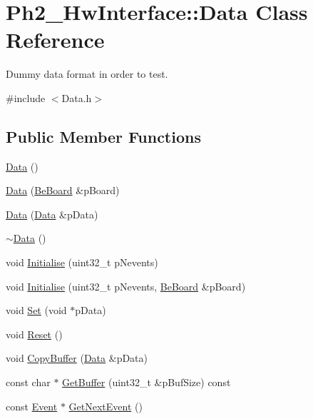 \hypertarget{class_ph2___hw_interface_1_1_data}{\section{Ph2\-\_\-\-Hw\-Interface\-:\-:Data Class Reference}
\label{class_ph2___hw_interface_1_1_data}
}


Dummy data format in order to test.  




{\ttfamily \#include $<$Data.\-h$>$}

\subsection*{Public Member Functions}
\begin{DoxyCompactItemize}
\item 
\hyperlink{class_ph2___hw_interface_1_1_data_a72e6b3c8af444dd82569d3a47f89812c}{Data} ()
\item 
\hyperlink{class_ph2___hw_interface_1_1_data_aa98dbf6219ca78afda306b2fa41dbcc5}{Data} (\hyperlink{class_ph2___hw_description_1_1_be_board}{Be\-Board} \&p\-Board)
\item 
\hyperlink{class_ph2___hw_interface_1_1_data_aefcb0c450523abe1c4397189f64a3aff}{Data} (\hyperlink{class_ph2___hw_interface_1_1_data}{Data} \&p\-Data)
\item 
\hyperlink{class_ph2___hw_interface_1_1_data_a889228098e5c0b4eb5d06ad7850cdd7e}{$\sim$\-Data} ()
\item 
void \hyperlink{class_ph2___hw_interface_1_1_data_ab3a85993abf1f3981ab917b5f87c4000}{Initialise} (uint32\-\_\-t p\-Nevents)
\item 
void \hyperlink{class_ph2___hw_interface_1_1_data_a4d6bcb42ecdaa4b5763a3b8279f22599}{Initialise} (uint32\-\_\-t p\-Nevents, \hyperlink{class_ph2___hw_description_1_1_be_board}{Be\-Board} \&p\-Board)
\item 
void \hyperlink{class_ph2___hw_interface_1_1_data_aec509baa349ed8a038797b63df76b3d9}{Set} (void $\ast$p\-Data)
\item 
void \hyperlink{class_ph2___hw_interface_1_1_data_ab33619d62d7662d11cf6c2bddebcc835}{Reset} ()
\item 
void \hyperlink{class_ph2___hw_interface_1_1_data_a751235bbc2393f58f9fd83b8837ad2b4}{Copy\-Buffer} (\hyperlink{class_ph2___hw_interface_1_1_data}{Data} \&p\-Data)
\item 
const char $\ast$ \hyperlink{class_ph2___hw_interface_1_1_data_a6093f26d20db6ca6a2a248b6bc8ddb25}{Get\-Buffer} (uint32\-\_\-t \&p\-Buf\-Size) const 
\item 
const \hyperlink{class_ph2___hw_interface_1_1_event}{Event} $\ast$ \hyperlink{class_ph2___hw_interface_1_1_data_a18d1e30edd97079893bbd2332809cba8}{Get\-Next\-Event} ()
\end{DoxyCompactItemize}
